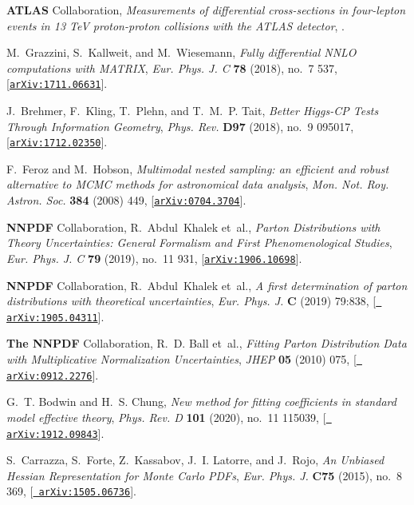 \documentclass[11pt,a4paper]{article}
\numberwithin{equation}{section}
\numberwithin{figure}{section}
\numberwithin{table}{section}
\begin{document}
\begin{thebibliography}{100}
{\bf ATLAS} Collaboration, {\it {Measurements of differential cross-sections in
  four-lepton events in 13 TeV proton-proton collisions with the ATLAS
  detector}}, .

M.~Grazzini, S.~Kallweit, and M.~Wiesemann, {\it {Fully differential NNLO
  computations with MATRIX}},  {\em Eur. Phys. J. C} {\bf 78} (2018), no.~7
  537, [\href{http://arxiv.org/abs/1711.06631}{{\tt arXiv:1711.06631}}].

J.~Brehmer, F.~Kling, T.~Plehn, and T.~M.~P. Tait, {\it {Better Higgs-CP Tests
  Through Information Geometry}},  {\em Phys. Rev.} {\bf D97} (2018), no.~9
  095017, [\href{http://arxiv.org/abs/1712.02350}{{\tt arXiv:1712.02350}}].

F.~Feroz and M.~Hobson, {\it {Multimodal nested sampling: an efficient and
  robust alternative to MCMC methods for astronomical data analysis}},  {\em
  Mon. Not. Roy. Astron. Soc.} {\bf 384} (2008) 449,
  [\href{http://arxiv.org/abs/0704.3704}{{\tt arXiv:0704.3704}}].

{\bf NNPDF} Collaboration, R.~Abdul~Khalek et~al., {\it {Parton Distributions
  with Theory Uncertainties: General Formalism and First Phenomenological
  Studies}},  {\em Eur. Phys. J. C} {\bf 79} (2019), no.~11 931,
  [\href{http://arxiv.org/abs/1906.10698}{{\tt arXiv:1906.10698}}].

{\bf NNPDF} Collaboration, R.~Abdul~Khalek et~al., {\it {A first determination
  of parton distributions with theoretical uncertainties}},  {\em Eur. Phys.
  J.} {\bf C} (2019) 79:838, [\href{http://arxiv.org/abs/1905.04311}{{\tt
  arXiv:1905.04311}}].

{\bf The NNPDF} Collaboration, R.~D. Ball et~al., {\it {Fitting Parton
  Distribution Data with Multiplicative Normalization Uncertainties}},  {\em
  JHEP} {\bf 05} (2010) 075, [\href{http://arxiv.org/abs/0912.2276}{{\tt
  arXiv:0912.2276}}].

G.~T. Bodwin and H.~S. Chung, {\it {New method for fitting coefficients in
  standard model effective theory}},  {\em Phys. Rev. D} {\bf 101} (2020),
  no.~11 115039, [\href{http://arxiv.org/abs/1912.09843}{{\tt
  arXiv:1912.09843}}].

S.~Carrazza, S.~Forte, Z.~Kassabov, J.~I. Latorre, and J.~Rojo, {\it {An
  Unbiased Hessian Representation for Monte Carlo PDFs}},  {\em Eur. Phys. J.}
  {\bf C75} (2015), no.~8 369, [\href{http://arxiv.org/abs/1505.06736}{{\tt
  arXiv:1505.06736}}].


\end{thebibliography}
\end{document}

